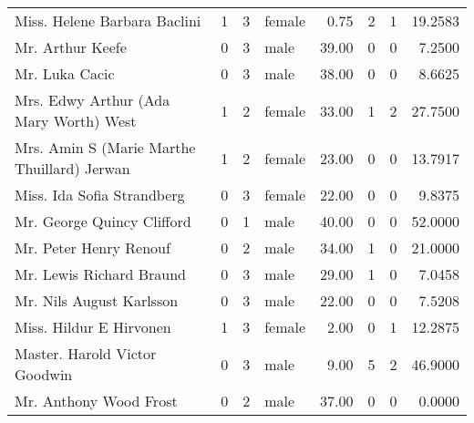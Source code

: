 \begin{tabular}{lrrlrrrr}
Miss. Helene Barbara Baclini                       &         1 &       3 &  female &   0.75 &                        2 &                        1 &   19.2583 \\
Mr. Arthur Keefe                                   &         0 &       3 &    male &  39.00 &                        0 &                        0 &    7.2500 \\
Mr. Luka Cacic                                     &         0 &       3 &    male &  38.00 &                        0 &                        0 &    8.6625 \\
Mrs. Edwy Arthur (Ada Mary Worth) West             &         1 &       2 &  female &  33.00 &                        1 &                        2 &   27.7500 \\
Mrs. Amin S (Marie Marthe Thuillard) Jerwan        &         1 &       2 &  female &  23.00 &                        0 &                        0 &   13.7917 \\
Miss. Ida Sofia Strandberg                         &         0 &       3 &  female &  22.00 &                        0 &                        0 &    9.8375 \\
Mr. George Quincy Clifford                         &         0 &       1 &    male &  40.00 &                        0 &                        0 &   52.0000 \\
Mr. Peter Henry Renouf                             &         0 &       2 &    male &  34.00 &                        1 &                        0 &   21.0000 \\
Mr. Lewis Richard Braund                           &         0 &       3 &    male &  29.00 &                        1 &                        0 &    7.0458 \\
Mr. Nils August Karlsson                           &         0 &       3 &    male &  22.00 &                        0 &                        0 &    7.5208 \\
Miss. Hildur E Hirvonen                            &         1 &       3 &  female &   2.00 &                        0 &                        1 &   12.2875 \\
Master. Harold Victor Goodwin                      &         0 &       3 &    male &   9.00 &                        5 &                        2 &   46.9000 \\
Mr. Anthony Wood Frost                             &         0 &       2 &    male &  37.00 &                        0 &                        0 &    0.0000 \\

\end{tabular}
